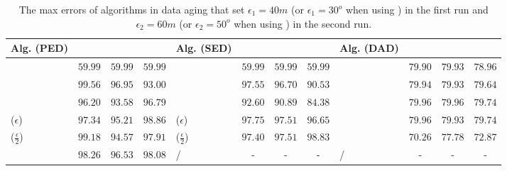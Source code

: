 \begin{table}
	\caption{\small The max errors of algorithms in data aging that set $\epsilon_1=40m$ (or $\epsilon_1=30^o$ when using \dad) in the first run and $\epsilon_2=60m$ (or $\epsilon_2=50^o$ when using \dad) in the second run.}
	\centering
	\scriptsize
	\vspace{-1ex}
	\begin{tabular}{|l|c|c|c|l|c|c|c|l|c|c|c|}
		\hline
		\bf{Alg. (PED)}  &\ucar &\geolife &\mopsi & \bf{Alg. (SED)}  &\ucar &\geolife &\mopsi &\bf{Alg. (DAD)}  &\ucar &\geolife &\mopsi \\
		\hline
		{\dpa} &	$59.99$ & $59.99 $ &	$59.99$	&\dpa &$59.99$ &$59.99$ & $59.99$ & \dpa	& $79.90$	& $79.93$	& $78.96 $ \\
		\hline
		{\tpa} &	$99.56$ & $96.95$ &	$93.00$	&\tpa 	& $97.55$& $96.70$ &$90.53$ & \tpa	& $79.94$	& $79.93$	& $79.64$ \\
		\hline
		{\bqsa} &	$96.20 $ & $93.58  $ &	$96.79 $	&\squishe &$92.60$ &$90.89$ & $84.38$ & \opwa	& $79.96$	& $79.96$	& $79.74$ \\
		\hline
		{\siped($\epsilon$)} &	$97.34   $ & $95.21  $ &	$98.86   $	&\cised($\epsilon$) & $97.75$ &$97.51$ &$96.65$ & \interval	& $79.96$	& $79.93$	& $79.74$ \\
		\hline
		{\siped($\frac{\epsilon}{2}$)} &	$99.18  $ & $94.57  $ &	$97.91  $ &\cised($\frac{\epsilon}{2}$) &$ 97.40 $ & $97.51$ & $98.83$& \intersec	& $70.26 $	& $77.78$	& $72.87$ \\
		\hline
		{\operb} &	${98.26} $ & ${96.53} $ & ${98.08} $	& / &- &- &- & / &- &- &- \\
		\hline
	\end{tabular}
	\label{tab:aging-me}

	\vspace{-2ex}
\end{table}


